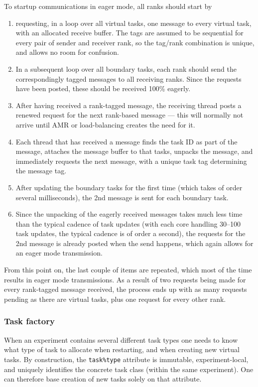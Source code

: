 \documentclass[paper=a4,fontsize=11pt]{scrartcl}
\numberwithin{equation}{section}		%
\numberwithin{figure}{section}			%
\numberwithin{table}{section}				%
\begin{document}
To startup communications in eager mode, all ranks should start by 
\begin{enumerate}
    \item requesting, in a loop over all virtual tasks, one message to every virtual task, with an allocated receive buffer.  The tags are assumed to be sequential for every pair of sender and receiver rank, so the tag/rank combination is unique, and allows no room for confusion.
    \item In a subsequent loop over all boundary tasks, each rank should send the correspondingly tagged messages to all receiving ranks.   Since the requests have been posted, these should be received 100\% eagerly.
    \item After having received a rank-tagged message, the receiving thread posts a renewed request for the next rank-based message --- this will normally not arrive until AMR or load-balancing creates the need for it. 
    \item Each thread that has received a message finds the task ID as part of the message, attaches the message buffer to that tasks, unpacks the message, and immediately requests the next message, with a unique task tag determining the message tag.
    \item After updating the boundary tasks for the first time (which takes of order several milliseconds), the 2nd message is sent for each boundary task.
    \item Since the unpacking of the eagerly received messages takes much less time than the typical cadence of task updates (with each core handling 30--100 task updates, the typical cadence is of order a second), the requests for the 2nd message is already posted when the send happens, which again allows for an eager mode transmission.
\end{enumerate}
From this point on, the last couple of items are repeated, which most of the time results in eager mode transmissions.
As a result of two requests being made for every rank-tagged message received, the process ends up with as many requests pending as there are virtual tasks, plus one request for every other rank.

\subsubsection{Task factory}
When an experiment contains several different task types one needs to know what type of task to allocate when restarting, and when creating new virtual tasks.  By construction, the \verb|task%type| attribute is immutable, experiment-local, and uniquely identifies the concrete task class (within the same experiment).  One can therefore base creation of new tasks solely on that attribute.
\end{document}
